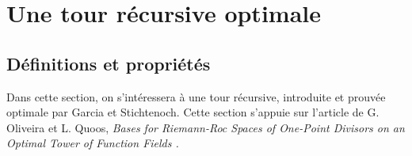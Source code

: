 \documentclass[10pt]{article}
\begin{document}
\section{Une tour récursive optimale}



\subsection{Définitions et propriétés}



Dans cette section, on s’intéressera à une tour récursive, introduite et prouvée optimale par Garcia et Stichtenoch. Cette section s'appuie sur l'article de G. Oliveira et L. Quoos, \it{Bases for Riemann-Roc Spaces of One-Point Divisors on an Optimal Tower of Function Fields} \rm.






\end{document}
